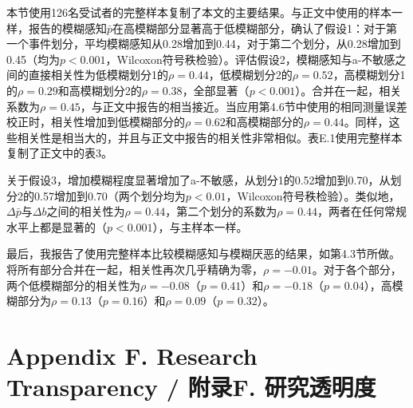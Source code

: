 \documentclass[12pt,a4paper]{article}
\newenvironment{translation}
  {\par\noindent\color{transblue}\ignorespaces}
  {\par\medskip\medskip}
\begin{document}
\begin{translation}
本节使用126名受试者的完整样本复制了本文的主要结果。与正文中使用的样本一样，报告的模糊感知$\bar{p}$在高模糊部分显著高于低模糊部分，确认了假设1：对于第一个事件划分，平均模糊感知从0.28增加到0.44，对于第二个划分，从0.28增加到0.45（均为$p < 0.001$，Wilcoxon符号秩检验）。评估假设2，模糊感知与a-不敏感之间的直接相关性为低模糊划分1的$\rho = 0.44$，低模糊划分2的$\rho = 0.52$，高模糊划分1的$\rho = 0.29$和高模糊划分2的$\rho = 0.38$，全部显著（$p < 0.001$）。合并在一起，相关系数为$\rho = 0.45$，与正文中报告的相当接近。当应用第4.6节中使用的相同测量误差校正时，相关性增加到低模糊部分的$\rho = 0.62$和高模糊部分的$\rho = 0.44$。同样，这些相关性是相当大的，并且与正文中报告的相关性非常相似。表E.1使用完整样本复制了正文中的表3。

关于假设3，增加模糊程度显著增加了a-不敏感，从划分1的0.52增加到0.70，从划分2的0.57增加到0.70（两个划分均为$p < 0.01$，Wilcoxon符号秩检验）。类似地，$\Delta \bar{p}$与$\Delta b$之间的相关性为$\rho = 0.44$，第二个划分的系数为$\rho = 0.44$，两者在任何常规水平上都是显著的（$p < 0.001$），与主样本一样。

最后，我报告了使用完整样本比较模糊感知与模糊厌恶的结果，如第4.3节所做。将所有部分合并在一起，相关性再次几乎精确为零，$\rho = -0.01$。对于各个部分，两个低模糊部分的相关性为$\rho = -0.08$（$p = 0.41$）和$\rho = -0.18$（$p = 0.04$），高模糊部分为$\rho = 0.13$（$p = 0.16$）和$\rho = 0.09$（$p = 0.32$）。
\end{translation}

\newpage
\section*{Appendix F. Research Transparency / 附录F. 研究透明度}
\end{document}
